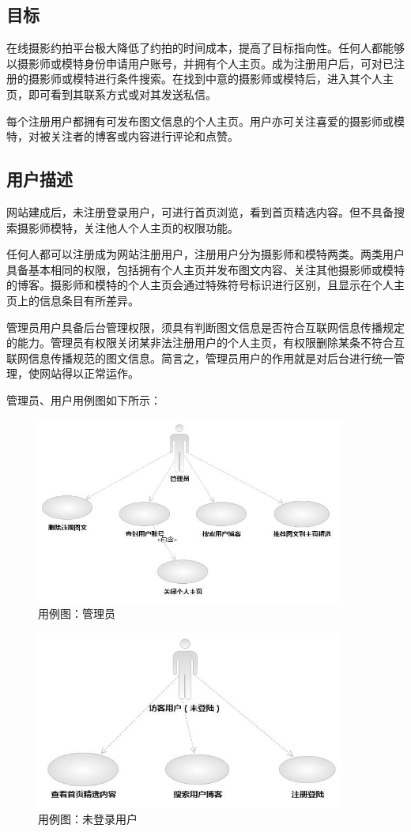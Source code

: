 \documentclass[a4paper,14pt]{ctexart}
\begin{document}
\subsection{目标}
在线摄影约拍平台极大降低了约拍的时间成本，提高了目标指向性。任何人都能够以摄影师或模特身份申请用户账号，并拥有个人主页。成为注册用户后，可对已注册的摄影师或模特进行条件搜索。在找到中意的摄影师或模特后，进入其个人主页，即可看到其联系方式或对其发送私信。\par
每个注册用户都拥有可发布图文信息的个人主页。用户亦可关注喜爱的摄影师或模特，对被关注者的博客或内容进行评论和点赞。\par


\subsection{用户描述}
网站建成后，未注册登录用户，可进行首页浏览，看到首页精选内容。但不具备搜索摄影师模特，关注他人个人主页的权限功能。\par
任何人都可以注册成为网站注册用户，注册用户分为摄影师和模特两类。两类用户具备基本相同的权限，包括拥有个人主页并发布图文内容、关注其他摄影师或模特的博客。摄影师和模特的个人主页会通过特殊符号标识进行区别，且显示在个人主页上的信息条目有所差异。\par
管理员用户具备后台管理权限，须具有判断图文信息是否符合互联网信息传播规定的能力。管理员有权限关闭某非法注册用户的个人主页，有权限删除某条不符合互联网信息传播规范的图文信息。简言之，管理员用户的作用就是对后台进行统一管理，使网站得以正常运作。\par
管理员、用户用例图如下所示：
\begin{figure}[H]
\centering\includegraphics[width=4in]{用例图-管理员.jpeg}
\caption{用例图：管理员}
\label{fig:1}
\end{figure}

\begin{figure}[H]
\centering\includegraphics[width=4in]{用例图-访客.jpeg}
\caption{用例图：未登录用户}
\label{fig:2}
\end{figure}
\end{document}
